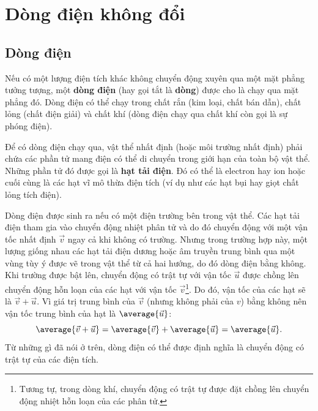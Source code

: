 

\chapter[Dòng điện không đổi]{Dòng điện không đổi}\label{chap:5}
\vspace{-0.3 cm}
\section{Dòng điện}\label{sec:5_1}

Nếu có một lượng điện tích khác không chuyển động xuyên qua một mặt phẳng tưởng tượng, một \textbf{dòng điện} (hay gọi tắt là \textbf{dòng}) được cho là chạy qua mặt phẳng đó. Dòng điện có thể chạy trong chất rắn (kim loại, chất bán dẫn), chất lỏng (chất điện giải) và chất khí (dòng điện chạy qua chất khí còn gọi là sự phóng điện). 

Để có dòng điện chạy qua, vật thể nhất định (hoặc môi trường nhất định) phải chứa các phần tử mang điện có thể di chuyển trong giới hạn của toàn bộ vật thể. Những phần tử đó được gọi là \textbf{hạt tải điện}. Đó có thể là electron hay ion hoặc cuối cùng là các hạt vĩ mô thừa điện tích (ví dụ như các hạt bụi hay giọt chất lỏng tích điện).


Dòng điện được sinh ra nếu có một điện trường bên trong vật thể. Các hạt tải điện tham gia vào chuyển động nhiệt phân tử và do đó chuyển động với một vận tốc nhất định $\vec{v}$ ngay cả khi không có trường. Nhưng trong trường hợp này, một lượng giống nhau các hạt tải điện dương hoặc âm truyền trung bình qua một vùng tùy ý được vẽ trong vật thể từ cả hai hướng, do đó dòng điện bằng không. Khi trường được bật lên, chuyển động có trật tự với vận tốc $\vec{u}$ được chồng lên chuyển động hỗn loạn của các hạt với vận tốc $\vec{v}$\footnote{Tương tự, trong dòng khí, chuyển động có trật tự được đặt chồng lên chuyển động nhiệt hỗn loạn của các phân tử.}. Do đó, vận tốc của các hạt sẽ là $\vec{v}+\vec{u}$. Vì giá trị trung bình của $\vec{v}$ (nhưng không phải của $v$) bằng không nên vận tốc trung bình của hạt là $\average{\vec{u}}$:
\begin{equation*}
    \average{\vec{v}+\vec{u}} = \average{\vec{v}} + \average{\vec{u}} = \average{\vec{u}}.
\end{equation*}
\noindent
Từ những gì đã nói ở trên, dòng điện có thể được định nghĩa là chuyển động có trật tự của các điện tích.

